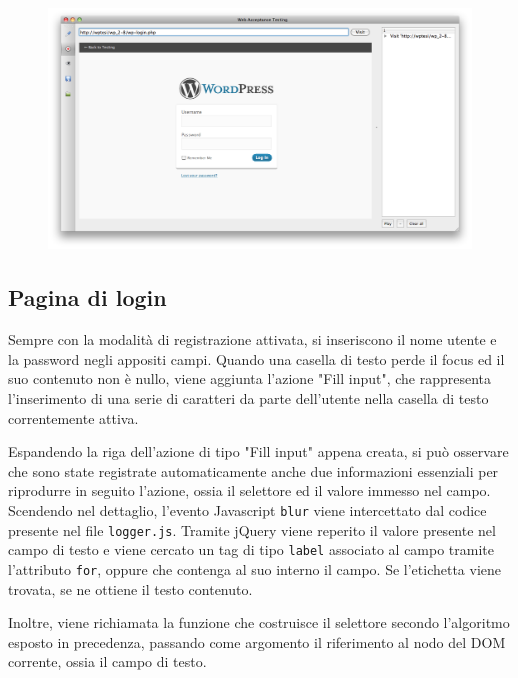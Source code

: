 \documentclass[12pt]{toptesi}
\begin{document}
\begin{figure}[htbp]
\begin{center}
\includegraphics[width=\textwidth]{images/wp_tour/1_login.png}
\end{center}
\end{figure}
 

\subsection{Pagina di login}

Sempre con la modalità di registrazione attivata, si inseriscono il nome utente e la password negli appositi campi. Quando una casella di testo perde il focus ed il suo contenuto non è nullo, viene aggiunta l'azione "Fill input", che rappresenta l'inserimento di una serie di caratteri da parte dell'utente nella casella di testo correntemente attiva. 

Espandendo la riga dell'azione di tipo "Fill input" appena creata, si può osservare che sono state registrate automaticamente anche due informazioni essenziali per riprodurre in seguito l'azione, ossia il selettore ed il valore immesso nel campo. Scendendo nel dettaglio, l'evento Javascript \verb|blur| viene intercettato dal codice presente nel file \verb|logger.js|. Tramite jQuery viene reperito il valore presente nel campo di testo e viene cercato un tag di tipo \verb|label| associato al campo tramite l'attributo \verb|for|, oppure che contenga al suo interno il campo. Se l'etichetta viene trovata, se ne ottiene il testo contenuto.

Inoltre, viene richiamata la funzione che costruisce il selettore secondo l'algoritmo esposto in precedenza, passando come argomento il riferimento al nodo del DOM corrente, ossia il campo di testo.
\end{document}
